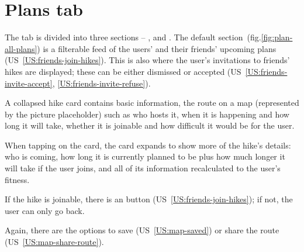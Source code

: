 \section{Plans tab}
The  tab is divided into three sections -- ,  and .
The default  section~(fig.\ref{fig:plan-all-plans}) is a filterable feed of the users' and their friends' upcoming plans (US~\ref{US:friends-join-hikes}).
This is also where the user's invitations to friends' hikes are displayed; these can be either dismissed or accepted (US~\ref{US:friends-invite-accept}, \ref{US:friends-invite-refuse}).

A collapsed hike card contains basic information, the route on a map (represented by the picture placeholder) such as who hosts it, when it is happening and how long it will take, whether it is joinable and how difficult it would be for the user.

When tapping on the card, the card expands to show more of the hike's details: 
who is coming, how long it is currently planned to be plus how much longer it will take if the user joins, and all of its information recalculated to the user's fitness.

If the hike is joinable, there is an  button (US~\ref{US:friends-join-hikes}); if not, the user can only go back.

Again, there are the options to save (US~\ref{US:map-saved}) or share the route (US~\ref{US:map-share-route}).

